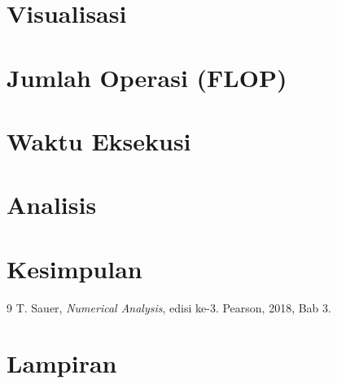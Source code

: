 \documentclass[12pt,a4paper]{article}
\begin{document}
\section{Visualisasi}\label{sec:visual}

\section{Jumlah Operasi (FLOP)}\label{sec:flop}

\section{Waktu Eksekusi}\label{sec:waktu}

\section{Analisis}\label{sec:analisis}

\section{Kesimpulan}

\begin{thebibliography}{9}
\renewcommand{\refname}{Referensi}
 T. Sauer, \emph{Numerical Analysis}, edisi ke-3. Pearson, 2018, Bab 3.
\end{thebibliography}

\appendix
\section{Lampiran}
\end{document}
